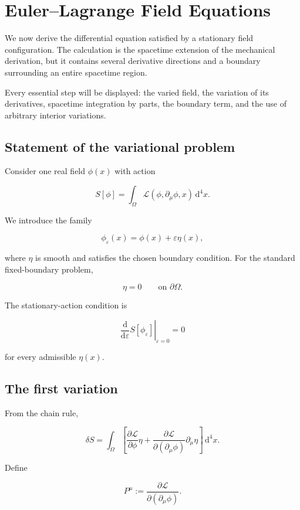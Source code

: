 \section{Euler--Lagrange Field Equations}
\label{sec:euler_lagrange_field_equations}

We now derive the differential equation satisfied by a stationary field configuration. The calculation is the spacetime extension of the mechanical derivation, but it contains several derivative directions and a boundary surrounding an entire spacetime region.

Every essential step will be displayed: the varied field, the variation of its derivatives, spacetime integration by parts, the boundary term, and the use of arbitrary interior variations.

\subsection{Statement of the variational problem}

Consider one real field \(\phi(x)\) with action

\[
S[\phi]
=
\int_{\Omega}
\mathcal{L}(\phi,\partial_{\mu}\phi,x)
\,\mathrm{d}^{4}x.
\]

We introduce the family

\[
\phi_{\varepsilon}(x)
=
\phi(x)+\varepsilon\eta(x),
\]

where \(\eta\) is smooth and satisfies the chosen boundary condition. For the standard fixed-boundary problem,

\[
\eta=0
\qquad
\text{on }\partial\Omega.
\]

The stationary-action condition is

\[
\left.
\frac{\mathrm{d}}{\mathrm{d}\varepsilon}
S[\phi_{\varepsilon}]
\right|_{\varepsilon=0}
=0
\]

for every admissible \(\eta(x)\).

\subsection{The first variation}

From the chain rule,

\[
\delta S
=
\int_{\Omega}
\left[
\frac{\partial\mathcal{L}}{\partial\phi}
\eta
+
\frac{\partial\mathcal{L}}
{\partial(\partial_{\mu}\phi)}
\partial_{\mu}\eta
\right]
\,\mathrm{d}^{4}x.
\]

Define

\[
P^{\mu}
:=
\frac{\partial\mathcal{L}}
{\partial(\partial_{\mu}\phi)}.
\]

